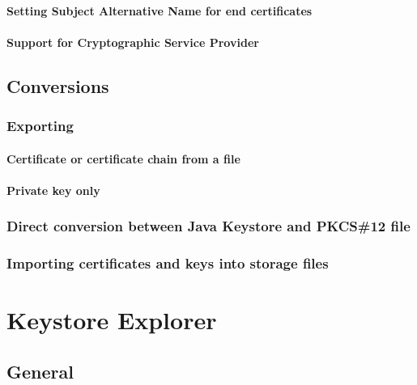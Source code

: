 \documentclass[10pt, a4paper]{report}
\begin{document}
    \subsubsection{Setting Subject Alternative Name for end certificates}
    
    \subsubsection{Support for Cryptographic Service Provider}
    
\section{Conversions}

  \subsection{Exporting}
  
    \subsubsection{Certificate or certificate chain from a file}
    
    \subsubsection{Private key only}
    
  \subsection{Direct conversion between Java Keystore and PKCS\#12 file}
  
  \subsection{Importing certificates and keys into storage files}
 

\chapter{Keystore Explorer}

\section{General}
\end{document}
